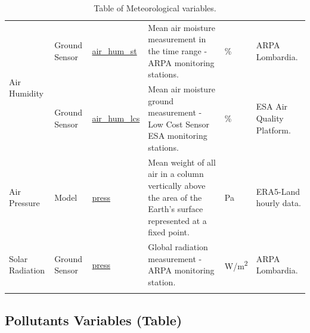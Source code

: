 \begin{center}
\begin{longtable}{ |p{2cm}|p{1.5cm}|p{2.3cm}|p{4cm}|p{1cm}|p{2cm}| }
\multirow{2}{4em}{Air Humidity} & Ground \newline Sensor  & \underline{air\_hum\_st} & Mean air moisture measurement in the time range - ARPA monitoring stations.\par & \% & ARPA \newline Lombardia.\\ 
& Ground \newline Sensor  & \underline{air\_hum\_lcs} &  Mean air moisture ground measurement - Low Cost Sensor ESA monitoring stations.\par & \% & ESA Air Quality Platform.\\ \hline

\multirow{1}{4em}{Air Pressure} & Model   & \underline{press} & Mean weight of all air in a column vertically above the area of the Earth's surface represented at a fixed point.\par & Pa & ERA5-Land hourly data.\\ \hline

\multirow{1}{4em}{Solar Radiation} & Ground \newline Sensor  & \underline{press} & Global radiation measurement - ARPA monitoring station.\par & W/m\textsuperscript{2} & ARPA \newline Lombardia.\\ \hline

\hline
\caption{Table of Meteorological variables.}

\end{longtable}
\end{center}

\subsection{Pollutants Variables (Table)}


